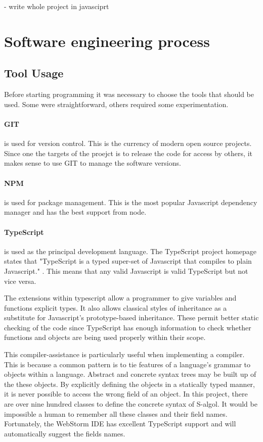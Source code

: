 \documentclass{article}
\begin{document}
-  write whole project in javasciprt

\section{Software engineering process}

\subsection{Tool Usage}

Before starting programming it was necessary to choose the tools that should be used. Some were straightforward, others required some experimentation.

\paragraph{GIT} is used for version control. This is the currency of modern open source projects. Since one the targets of the proejct is to release the code for access by others, it makes sense to use GIT to manage the software versions.

\paragraph{NPM} is used for package management. This is the most popular Javascript dependency manager and has the best support from node.

\paragraph{TypeScript} is used as the principal development language. The TypeScript project homepage states that "TypeScript is a typed super-set of Javascript that compiles to plain Javascript." \cite{typescript}. This means that any valid Javascript is valid TypeScript but not vice versa.

The extensions within typescript allow a programmer to give variables and functions explicit types. It also allows classical styles of inheritance as a substitute for Javascript's prototype-based inheritance. These permit better static checking of the code since TypeScript has enough information to check whether functions and objects are being used properly within their scope.

This compiler-assistance is particularly useful when implementing a compiler. This is because a common pattern is to tie features of a language's grammar to objects within a language. Abstract and concrete syntax trees may be built up of the these objects. By explicitly defining the objects in a statically typed manner, it is never possible to access the wrong field of an object. In this project, there are over nine hundred classes to define the concrete syntax of S-algol. It would be impossible a human to remember all these classes and their field names. Fortunately, the WebStorm IDE has excellent TypeScript support and will automatically suggest the fields names.
\end{document}
